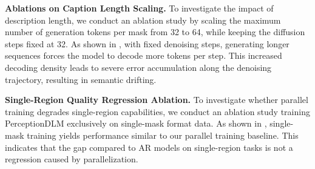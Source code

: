 \begin{table}[htbp]
\centering
\setlength{\belowcaptionskip}{8pt}
\caption{Inference with Exceeded Visual Prompts (Evaluated using Qwen3.5-27B Judge).}
\label{tab:exceeded_prompts}
\setlength{\tabcolsep}{6pt}
\renewcommand{\arraystretch}{1.15}
\end{table}

\noindent
\textbf{Ablations on Caption Length Scaling.}
To investigate the impact of description length, we conduct an ablation study by scaling the maximum number of generation tokens per mask from 32 to 64, while keeping the diffusion steps fixed at 32. As shown in , with fixed denoising steps, generating longer sequences forces the model to decode more tokens per step. This increased decoding density leads to severe error accumulation along the denoising trajectory, resulting in semantic drifting.

\begin{table}[htbp]
\centering
\setlength{\belowcaptionskip}{8pt}
\caption{Caption length scaling on Parallel Captioning(Evaluated using Qwen3.5-27B Judge).}
\label{tab:length_scaling}
\setlength{\tabcolsep}{6pt}
\renewcommand{\arraystretch}{1.15}
\end{table}

\noindent
\textbf{Single-Region Quality Regression Ablation.}
To investigate whether parallel training degrades single-region capabilities, we conduct an ablation study training PerceptionDLM exclusively on single-mask format data. As shown in , single-mask training yields performance similar to our parallel training baseline. This indicates that the gap compared to AR models on single-region tasks is not a regression caused by parallelization.

